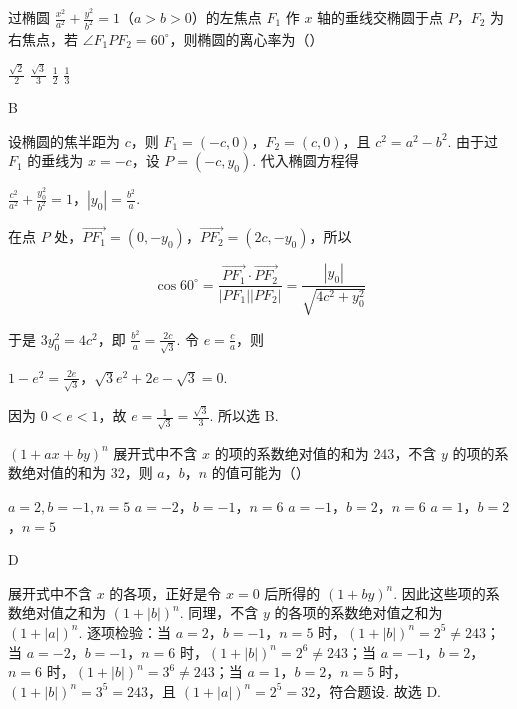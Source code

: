 \begin{problem}
过椭圆 \(\frac{x^2}{a^2} + \frac{y^2}{b^2} = 1\)（\(a > b > 0\)）的左焦点 \(F_1\) 作 \(x\) 轴的垂线交椭圆于点 \(P\)，\(F_2\) 为右焦点，若 \(\angle F_1PF_2 = 60^\circ\)，则椭圆的离心率为（\quad）

\choices
    {\(\frac{\sqrt{2}}{2}\)}
    {\(\frac{\sqrt{3}}{3}\)}
    {\(\frac{1}{2}\)}
    {\(\frac{1}{3}\)}
\end{problem}

\begin{answer}
B
\end{answer}

\begin{solution}
设椭圆的焦半距为 \(c\)，则 \(F_1=(-c,0)\)，\(F_2=(c,0)\)，且 \(c^2=a^2-b^2\). 由于过 \(F_1\) 的垂线为 \(x=-c\)，设 \(P=(-c,y_0)\). 代入椭圆方程得

\(\frac{c^2}{a^2}+\frac{y_0^2}{b^2}=1\)，\(|y_0|=\frac{b^2}{a}\).

在点 \(P\) 处，\(\overrightarrow{PF_1}=(0,-y_0)\)，\(\overrightarrow{PF_2}=(2c,-y_0)\)，所以

\[
\cos60^\circ=\frac{\overrightarrow{PF_1}\cdot\overrightarrow{PF_2}}{|PF_1||PF_2|}
=\frac{|y_0|}{\sqrt{4c^2+y_0^2}}
\]

于是 \(3y_0^2=4c^2\)，即 \(\frac{b^2}{a}=\frac{2c}{\sqrt3}\). 令 \(e=\frac ca\)，则

\(1-e^2=\frac{2e}{\sqrt3}\)，\(\sqrt3e^2+2e-\sqrt3=0\).

因为 \(0<e<1\)，故 \(e=\frac1{\sqrt3}=\frac{\sqrt3}{3}\). 所以选 B.
\end{solution}

\begin{problem}
\((1 + ax + by)^{n}\) 展开式中不含 \(x\) 的项的系数绝对值的和为 \(243\)，不含 \(y\) 的项的系数绝对值的和为 \(32\)，则 \(a\)，\(b\)，\(n\) 的值可能为（\quad）

\choices
    {\(a = 2, b = -1, n = 5\)}
    {\(a = -2\)，\(b = -1\)，\(n = 6\)}
    {\(a = -1\)，\(b = 2\)，\(n = 6\)}
    {\(a = 1\)，\(b = 2\)，\(n = 5\)}
\end{problem}

\begin{answer}
D
\end{answer}

\begin{solution}
展开式中不含 \(x\) 的各项，正好是令 \(x=0\) 后所得的 \((1+by)^n\). 因此这些项的系数绝对值之和为 \((1+|b|)^n\). 同理，不含 \(y\) 的各项的系数绝对值之和为 \((1+|a|)^n\). 逐项检验：当 \(a=2\)，\(b=-1\)，\(n=5\) 时，\((1+|b|)^n=2^5\ne243\)；当 \(a=-2\)，\(b=-1\)，\(n=6\) 时，\((1+|b|)^n=2^6\ne243\)；当 \(a=-1\)，\(b=2\)，\(n=6\) 时，\((1+|b|)^n=3^6\ne243\)；当 \(a=1\)，\(b=2\)，\(n=5\) 时，\((1+|b|)^n=3^5=243\)，且 \((1+|a|)^n=2^5=32\)，符合题设. 故选 D.
\end{solution}

